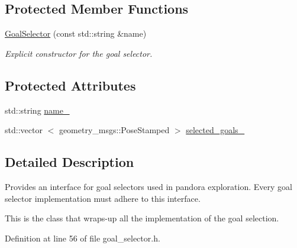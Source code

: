 \subsection*{\-Protected \-Member \-Functions}
\begin{DoxyCompactItemize}
\item 
\hyperlink{classpandora__exploration_1_1_goal_selector_a1b82530b95904a1cca524f594400c109}{\-Goal\-Selector} (const std\-::string \&name)
\begin{DoxyCompactList}\small\item\em \-Explicit constructor for the goal selector. \end{DoxyCompactList}\end{DoxyCompactItemize}
\subsection*{\-Protected \-Attributes}
\begin{DoxyCompactItemize}
\item 
std\-::string \hyperlink{classpandora__exploration_1_1_goal_selector_ac5cc62a873e072a37776cc7c231f03af}{name\-\_\-}
\item 
std\-::vector\*
$<$ geometry\-\_\-msgs\-::\-Pose\-Stamped $>$ \hyperlink{classpandora__exploration_1_1_goal_selector_aebc56a4f3b399e0e72c0de5e1ab58187}{selected\-\_\-goals\-\_\-}
\end{DoxyCompactItemize}


\subsection{\-Detailed \-Description}
\-Provides an interface for goal selectors used in pandora exploration. \-Every goal selector implementation must adhere to this interface. 

\-This is the class that wraps-\/up all the implementation of the goal selection. 

\-Definition at line 56 of file goal\-\_\-selector.\-h.



